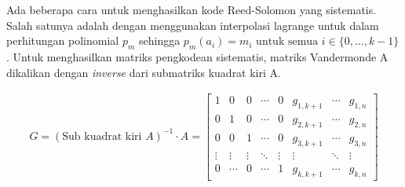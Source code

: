 




Ada beberapa cara untuk menghasilkan kode Reed-Solomon yang sistematis. Salah satunya adalah dengan menggunakan interpolasi lagrange untuk dalam perhitungan polinomial $p_m$ sehingga $p_m(a_i) = m_i \text{ untuk semua } i \in \{0,\ldots,k-1\}$ \parencite{plank1996tutorial}. Untuk menghasilkan matriks pengkodean sistematis, matriks Vandermonde A dikalikan dengan \textit{inverse} dari submatriks kuadrat kiri A.

\begin{align}
    G = {(\text{Sub kuadrat kiri } A)}^{-1} \cdot A = 
    \begin{bmatrix}
        1 & 0 & 0 & \cdots & 0 & g_{1,k+1} & \cdots & g_{1,n} \\
        0 & 1 & 0 & \cdots & 0 & g_{2,k+1} & \cdots & g_{2,n} \\
        0 & 0 & 1 & \cdots & 0 & g_{3,k+1} & \cdots & g_{3,n} \\
        \vdots & \vdots & \vdots & \ddots & \vdots & \vdots & \ddots & \vdots \\
        0 & \cdots & 0 & \cdots & 1 & g_{k,k+1} & \cdots & g_{k,n}
    \end{bmatrix}
    \label{eq:encoding_matrix}
\end{align}

